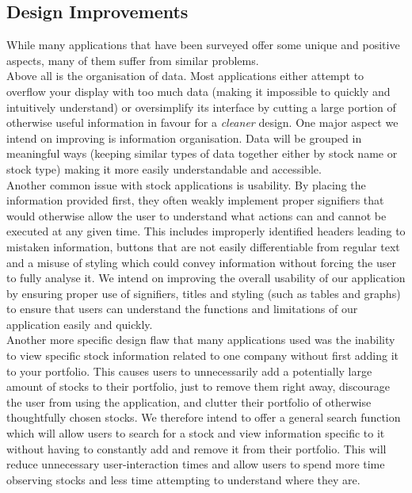 \documentclass{sigchi}
\begin{document}
\subsection{Design Improvements}
While many applications that have been surveyed offer some unique and positive aspects, many of them suffer from similar problems. \\
Above all is the organisation of data. Most applications either attempt to overflow your display with too much data (making it impossible to quickly and intuitively understand) or oversimplify its interface by cutting a large portion of otherwise useful information in favour for a \textit{cleaner} design. One major aspect we intend on improving is information organisation. Data will be grouped in meaningful ways (keeping similar types of data together either by stock name or stock type) making it more easily understandable and accessible. \\
Another common issue with stock applications is usability. By placing the information provided first, they often weakly implement proper signifiers that would otherwise allow the user to understand what actions can and cannot be executed at any given time. This includes improperly identified headers leading to mistaken information, buttons that are not easily differentiable from regular text and a misuse of styling which could convey information without forcing the user to fully analyse it. We intend on improving the overall usability of our application by ensuring proper use of signifiers, titles and styling (such as tables and graphs) to ensure that users can understand the functions and limitations of our application easily and quickly. \\
Another more specific design flaw that many applications used was the inability to view specific stock information related to one company without first adding it to your portfolio. This causes users to unnecessarily add a potentially large amount of stocks to their portfolio, just to remove them right away, discourage the user from using the application, and clutter their portfolio of otherwise thoughtfully chosen stocks. We therefore intend to offer a general search function which will allow users to search for a stock and view information specific to it without having to constantly add and remove it from their portfolio. This will reduce unnecessary user-interaction times and allow users to spend more time observing stocks and less time attempting to understand where they are. 
\end{document}

